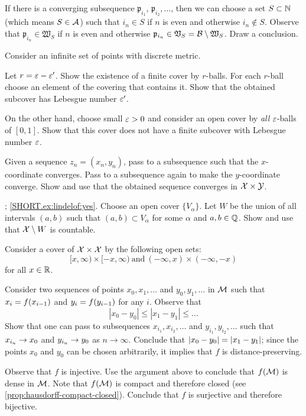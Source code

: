 If there is a converging subsequence $\mathfrak{p}_{i_1}$, $\mathfrak{p}_{i_2},\ldots$,
then we can choose a set $S\subset \mathbb{N}$ (which means $S\in \mathcal{A}$) such that $i_n\in S$ if $n$ is even and otherwise $i_n\notin S$.
Observe that $\mathfrak{p}_{i_n}\in \mathfrak{W}_{S}$ if $n$ is even and otherwise $\mathfrak{p}_{i_n}\in \mathfrak{V}_{S}=\mathcal{B}\setminus \mathfrak{W}_{S}$.
Draw a conclusion.

Consider an infinite set of points with discrete metric.

Let $r=\varepsilon-\varepsilon'$.
Show the existence of a finite cover by $r$-balls.
For each $r$-ball choose an element of the covering that contains it.
Show that the obtained subcover has Lebesgue number $\varepsilon'$.

On the other hand, choose small $\varepsilon>0$ and consider an open cover by \textit{all} $\varepsilon$-balls of $[0,1]$.
Show that this cover does not have a finite subcover with Lebesgue number $\varepsilon$.

Given a sequence $z_n=(x_n,y_n)$, pass to a subsequence such that the $x$-coordinate converges.
Pass to a subsequence again to make the $y$-coordinate converge.
Show and use that the obtained sequence converges in $\mathcal{X}\times\mathcal{Y}$.

\parbf{\ref{ex:lindelof}}; \ref{SHORT.ex:lindelof:yes}.
Choose an open cover $\{V_\alpha\}$.
Let $W$ be the union of all intervals $(a,b)$ such that $(a,b)\subset V_\alpha$ for some $\alpha$ and $a,b\in\mathbb{Q}$.
Show and use that $\mathcal{X}\setminus W$ is countable.

Consider a cover of $\mathcal{X}\times \mathcal{X}$ by the following open sets:
\[[x,\infty)\times[-x,\infty)\ \text{and}\ (-\infty,x)\times(-\infty,-x)\]
for all $x\in\mathbb{R}$.

Consider two sequences of points $x_0,x_1,\ldots$ and $y_0,y_1,\ldots$ in $\mathcal{M}$ such that $x_i\z=f(x_{i-1})$ and $y_i\z=f(y_{i-1})$ for any $i$.
Observe that
\[|x_0-y_0|\le |x_1-y_1|\le\ldots\]
Show that one can pass to subsequences $x_{i_1},x_{i_2},\ldots$ and  $y_{i_1},y_{i_2},\ldots$ such that $x_{i_n}\z\to x_0$ and $y_{i_n}\z\to y_0$ as $n\to\infty$.
Conclude that $|x_0-y_0|\z=|x_1-y_1|$; since the points $x_0$ and $y_0$ can be chosen arbitrarily, it implies that $f$ is distance-preserving.

Observe that $f$ is injective.
Use the argument above to conclude that $f(\mathcal{M})$ is dense in $\mathcal{M}$.
Note that $f(\mathcal{M})$ is compact and therefore closed (see \ref{prop:hausdorff-compact-closed}).
Conclude that $f$ is surjective and therefore bijective.

